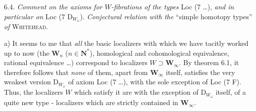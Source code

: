6.4. \textit{Comment on the axioms for $W$-fibrations of the types} Loc (7 \ldots), \textit{and in particular on} Loc (7 D$_{W_\omega}$). \textit{Conjectural relation with the} ``simple homotopy types'' \textit{of} \textsc{Whitehead}. %

a) It seems to me that \textit{all} the basic localizers with which we have tacitly worked up to now (the $\mathbf{W}_n$ ($n \in \mathbf{N}^*$), homological and cohomological equivalence, rational equivalence \ldots) correspond to localizers $W \supset \mathbf{W}_\infty$. By theorem 6.1, it therefore follows that \textit{none} of them, apart from $\mathbf{W}_\infty$ itself, satisfies the very weakest version D$_{W_\omega}$ of axiom Loc (7 \ldots), with the sole exception of Loc (7 F). Thus, the localizers $W$ which satisfy it are with the exception of D$_{W_\omega}$ itself, of a quite new type - localizers which are strictly contained in $\mathbf{W}_\infty$.

